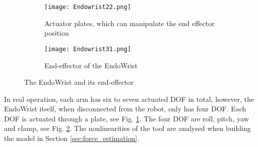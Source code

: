 \begin{figure}[h]
  \centering
  \begin{subfigure}{.22\textwidth}
    \centering
    \texttt{[image: Endowrist22.png]}
    \caption{Actuator plates, which can manipulate the end effector position}
    \label{fig:Endo_plates}
  \end{subfigure}
  \begin{subfigure}{.22\textwidth}
    \centering
    \texttt{[image: Endowrist31.png]}
    \caption{End-effector of the EndoWrist\newline}
    \label{fig:Endo_end}
  \end{subfigure}
\caption{The EndoWrist and its end-effector}
\label{fig:endowrits_set}
\end{figure}

In real operation, each arm has six to seven actuated DOF in total, however, the EndoWrist itself, when disconnected from the robot, only has four DOF. Each DOF is actuated through a plate, see Fig. \ref{fig:Endo_plates}. The four DOF are roll, pitch, yaw and clamp, see Fig. \ref{fig:Endo_end}. The nonlinearities of the tool are analysed when building the model in Section \ref{sec:force_estimation}.






